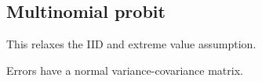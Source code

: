 
\subsection{Multinomial probit}

This relaxes the IID and extreme value assumption.

Errors have a normal variance-covariance matrix.

